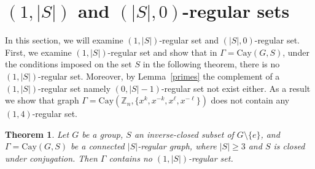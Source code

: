 \documentclass[12pt]{article}
\newtheorem{thm}[formula]{Theorem}
\begin{document}
\section{\bf $(1,|S|)$ and $(|S|,0)$-regular sets}
\quad In this section, we will examine $(1,|S|)$-regular set and $(|S|,0)$-regular set. First, we examine $(1,|S|)$-regular set and show that in $\Gamma = \mathrm{Cay}(G, S)$, under the conditions imposed on the set $S$ in the following theorem, there is no $(1,|S|)$-regular set. Moreover, by Lemma~\ref{primes} the complement of a $(1,|S|)$-regular set namely $(0,|S|-1)$-regular set not exist either. As a result we show that graph $\Gamma = \mathrm{Cay}(\mathbb{Z}_n, \{x^k, x^{-k}, x^\ell, x^{-\ell}\})$ does not contain any $(1,4)$-regular set.
\begin{thm}\label{$(1,|S|)$}
	Let $G$ be a group, $S$ an inverse-closed subset of $G \setminus \lbrace e \rbrace$, and $\Gamma = \mathrm{Cay}(G, S)$ be a connected $|S|$-regular graph, where  $|S|\geq3$ and $S$ is closed under conjugation. Then $\Gamma$ contains no $(1,|S|)$-regular set.
\end{thm}
\end{document}
